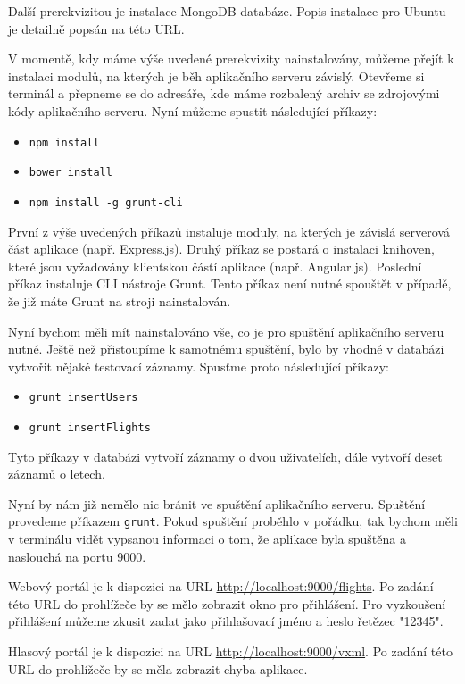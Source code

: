 \documentclass[ing,male,java,dept460,twoside]{diploma}						%
\begin{document}
Další prerekvizitou je instalace MongoDB databáze. Popis instalace pro Ubuntu je detailně popsán na této URL\cite{Mongo_install}.

V momentě, kdy máme výše uvedené prerekvizity nainstalovány, můžeme přejít k instalaci modulů, na kterých je běh aplikačního serveru závislý. Otevřeme si terminál a přepneme se do adresáře, kde máme rozbalený archiv se zdrojovými kódy aplikačního serveru. Nyní můžeme spustit následující příkazy:

\begin{itemize}
\item \texttt{npm install}
\item \texttt{bower install}
\item \texttt{npm install -g grunt-cli}
\end{itemize}

První z výše uvedených příkazů instaluje moduly, na kterých je závislá serverová část aplikace (např. Express.js). Druhý příkaz se postará o instalaci knihoven, které jsou vyžadovány klientskou částí aplikace (např. Angular.js). Poslední příkaz instaluje CLI nástroje Grunt. Tento příkaz není nutné spouštět v případě, že již máte Grunt na stroji nainstalován.

Nyní bychom měli mít nainstalováno vše, co je pro spuštění aplikačního serveru nutné. Ještě než přistoupíme k samotnému spuštění, bylo by vhodné v databázi vytvořit nějaké testovací záznamy. Spusťme proto následující příkazy:

\begin{itemize}
\item \texttt{grunt insertUsers}
\item \texttt{grunt insertFlights}
\end{itemize}

Tyto příkazy v databázi vytvoří záznamy o dvou uživatelích, dále vytvoří deset záznamů o letech.

Nyní by nám již nemělo nic bránit ve spuštění aplikačního serveru. Spuštění provedeme příkazem \texttt{grunt}. Pokud spuštění proběhlo v pořádku, tak bychom měli v terminálu vidět vypsanou informaci o tom, že aplikace byla spuštěna a naslouchá na portu 9000.

Webový portál je k dispozici na URL \url{http://localhost:9000/flights}. Po zadání této URL do prohlížeče by se mělo zobrazit okno pro přihlášení. Pro vyzkoušení přihlášení můžeme zkusit zadat jako přihlašovací jméno a heslo řetězec "12345".

Hlasový portál je k dispozici na URL \url{http://localhost:9000/vxml}. Po zadání této URL do prohlížeče by se měla zobrazit chyba aplikace.
\end{document}
